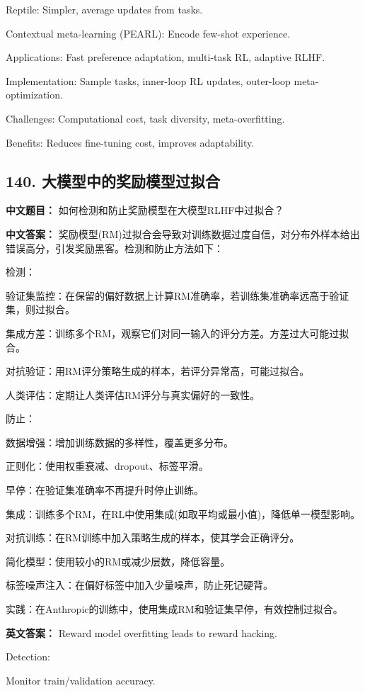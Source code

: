 \documentclass[10pt,a4paper]{ctexart}
\begin{document}
Reptile: Simpler, average updates from tasks.

Contextual meta-learning (PEARL): Encode few-shot experience.

Applications: Fast preference adaptation, multi-task RL, adaptive RLHF.

Implementation: Sample tasks, inner-loop RL updates, outer-loop meta-optimization.

Challenges: Computational cost, task diversity, meta-overfitting.

Benefits: Reduces fine-tuning cost, improves adaptability.

\subsection*{140. 大模型中的奖励模型过拟合}
\textbf{中文题目：} 如何检测和防止奖励模型在大模型RLHF中过拟合？

\textbf{中文答案：}
奖励模型(RM)过拟合会导致对训练数据过度自信，对分布外样本给出错误高分，引发奖励黑客。检测和防止方法如下：

检测：

验证集监控：在保留的偏好数据上计算RM准确率，若训练集准确率远高于验证集，则过拟合。

集成方差：训练多个RM，观察它们对同一输入的评分方差。方差过大可能过拟合。

对抗验证：用RM评分策略生成的样本，若评分异常高，可能过拟合。

人类评估：定期让人类评估RM评分与真实偏好的一致性。

防止：

数据增强：增加训练数据的多样性，覆盖更多分布。

正则化：使用权重衰减、dropout、标签平滑。

早停：在验证集准确率不再提升时停止训练。

集成：训练多个RM，在RL中使用集成(如取平均或最小值)，降低单一模型影响。

对抗训练：在RM训练中加入策略生成的样本，使其学会正确评分。

简化模型：使用较小的RM或减少层数，降低容量。

标签噪声注入：在偏好标签中加入少量噪声，防止死记硬背。

实践：在Anthropic的训练中，使用集成RM和验证集早停，有效控制过拟合。

\textbf{英文答案：}
Reward model overfitting leads to reward hacking.

Detection:

Monitor train/validation accuracy.
\end{document}

